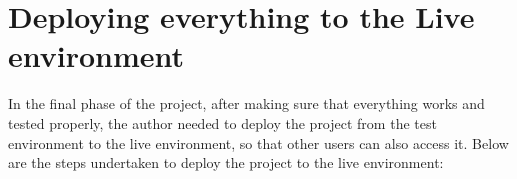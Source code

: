 



\section{Deploying everything to the Live environment}

In the final phase of the project, after making sure that everything works and tested properly, the author needed to deploy the project
from the test environment to the live environment, so that other users can also access it. Below are the steps undertaken to deploy the
project to the live environment:

